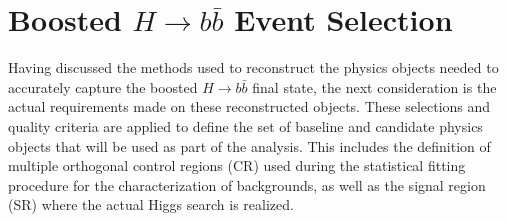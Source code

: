 \chapter{Boosted $H \rightarrow b\bar{b}$ Event Selection} \label{chap:selection}

Having discussed the methods used to reconstruct the physics objects needed to
accurately capture the boosted $H \rightarrow b\bar{b}$ final state, the next
consideration is the actual requirements made on these reconstructed objects.
These selections and quality criteria are applied to define the set of baseline
and candidate physics objects that will be used as part of the analysis.  This
includes the definition of multiple orthogonal control regions (CR) used during
the statistical fitting procedure for the characterization of backgrounds, as
well as the signal region (SR) where the actual Higgs search is realized.



